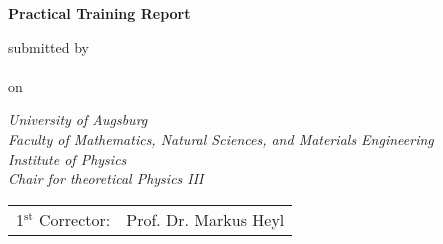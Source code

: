 

\newcommand{\mail}{jonas.kell@student.uni-augsburg.de}



\begin{titlepage}
    
\color{dblue}

\begin{center}
    \vspace*{2cm}
    \Huge
    \textbf{\thetitle}

    \vspace*{1.5cm}
    \color{black}
    \textbf{Practical Training Report}

    \vspace*{1cm}
    \normalsize
    submitted by\\
    \LARGE
    \theauthor\\\vspace*{0.3cm}
    \normalsize
    on \thedate

    \vspace{1.8cm}
    \color{black}
    \emph{University of Augsburg}\\
    \emph{Faculty of Mathematics, Natural Sciences, and Materials Engineering}\\
    \emph{Institute of Physics}\\
    \emph{Chair for theoretical Physics III}

    \vfill

    \begin{tabular}{rl}
        1$^\text{st}$ Corrector: &Prof. Dr. Markus Heyl\\
    \end{tabular}
\end{center}

\end{titlepage}
